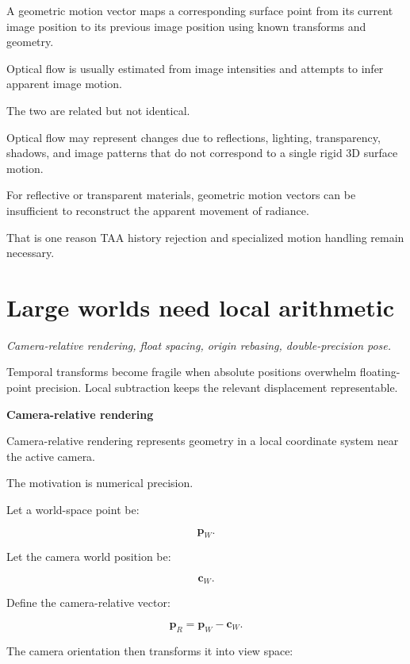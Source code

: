 \hypertarget{02-foundations-ii-ch036-motion-vectors-are-not-optical-flow}{}

A geometric motion vector maps a corresponding surface point from its current image position to its previous image position using known transforms and geometry.

Optical flow is usually estimated from image intensities and attempts to infer apparent image motion.

The two are related but not identical.

Optical flow may represent changes due to reflections, lighting, transparency, shadows, and image patterns that do not correspond to a single rigid 3D surface motion.

For reflective or transparent materials, geometric motion vectors can be insufficient to reconstruct the apparent movement of radiance.

That is one reason TAA history rejection and specialized motion handling remain necessary.

\section{Large worlds need local arithmetic}\label{02-foundations-ii-ch036-large-worlds-need-local-arithmetic}

\hypertarget{02-foundations-ii-ch036-large-worlds-need-local-arithmetic}{}

\emph{Camera-relative rendering, float spacing, origin rebasing, double-precision pose.}

Temporal transforms become fragile when absolute positions overwhelm floating-point precision. Local subtraction keeps the relevant displacement representable.

\textbf{Camera-relative rendering}

Camera-relative rendering represents geometry in a local coordinate system near the active camera.

The motivation is numerical precision.

Let a world-space point be:

\[
 \mathbf p_W.
\]

Let the camera world position be:

\[
 \mathbf c_W.
\]

Define the camera-relative vector:

\[
 \boxed{ \mathbf p_R=\mathbf p_W-\mathbf c_W }.
\]

The camera orientation then transforms it into view space:


